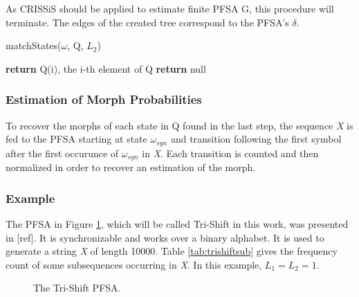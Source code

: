 {As CRISSiS should be applied to estimate finite PFSA G, this procedure will terminate. The edges of the created tree correspond to the PFSA's $\delta$.   

\begin{algorithm}
\caption{matchStates($\omega$, Q, $L_2$)\label{alg:matchstates}}
\begin{algorithmic}[1]
			\State \textbf{return} Q(i), the i-th element of Q
		\EndIf
	\EndFor
	\State \textbf{return} null
\end{algorithmic}
\end{algorithm}

\subsubsection{Estimation of Morph Probabilities}

To recover the morphs of each state in Q found in the last step, the sequence \textit{X} is fed to the PFSA starting at state $\omega_{syn}$ and transition following the first symbol after the first occurunce of $\omega_{syn}$ in \textit{X}. Each transition is counted and then normalized in order to recover an estimation of the morph.

\subsubsection{Example}

The PFSA in Figure \ref{fig:trishift}, which will be called Tri-Shift in this work, was presented in [ref]. It is synchronizable and works over a binary alphabet. It is used to generate a string \textit{X} of length 10000. Table \ref{tab:trishiftsub} gives the frequency count of some subsequences occurring in \textit{X}. In this example, $L_1 = L_2 = 1$.

\begin{figure}
\centering
{}
\caption{The Tri-Shift PFSA.\label{fig:trishift}}
\end{figure}

}

